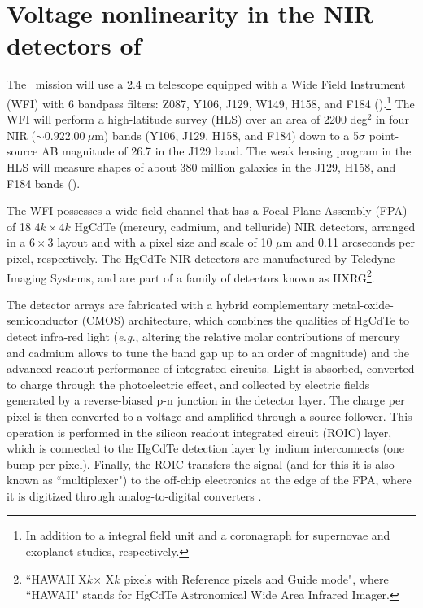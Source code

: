 \documentclass[11pt,preprint,flushrt]{aastex}
\begin{document}
\section{Voltage nonlinearity in the NIR detectors of \wfa}
\label{section:NL}

The \wfa\ mission will use a 2.4 m telescope equipped with a Wide Field Instrument (WFI) with 6 bandpass filters: Z087, Y106, J129, W149, H158, and F184 (\citealt{spergel15}).\footnote{In addition to a integral field unit and a coronagraph for supernovae and exoplanet studies, respectively.} The WFI will perform a high-latitude survey (HLS) over an area of 2200 deg$^2$ in four NIR ($\sim0.92$\textendash $2.00\ \mu$m) bands (Y106, J129, H158, and F184) down to a 5$\sigma$ point-source AB magnitude of 26.7 in the J129 band. The weak lensing program in the HLS will measure shapes of about 380 million galaxies in the J129, H158, and F184 bands (\citealt{spergel15}). 

The WFI possesses a wide-field channel that has a Focal Plane Assembly (FPA) of 18 $4 k\times 4k$ HgCdTe (mercury, cadmium, and telluride) NIR detectors, arranged in a $6\times3$ layout and with a pixel size and scale of 10 $\mu$m and 0.11 arcseconds per pixel, respectively. The HgCdTe NIR detectors are manufactured by Teledyne Imaging Systems, and are part of a family of detectors known as HXRG\footnote{``HAWAII X$k$$\times$ X$k$ pixels with Reference pixels and Guide mode", where ``HAWAII" stands for HgCdTe Astronomical Wide Area Infrared Imager.}. 

The detector arrays are fabricated with a hybrid complementary metal-oxide-semiconductor (CMOS) architecture, which combines the qualities of HgCdTe to detect infra-red light (\emph{e.g.}, altering the relative molar contributions of mercury and cadmium allows to tune the band gap up to an order of magnitude) and the advanced readout performance of integrated circuits. Light is absorbed, converted to charge through the photoelectric effect, and collected by electric fields generated by a reverse-biased p-n junction in the detector layer.  The charge per pixel is then converted to a voltage and amplified through a source follower. This operation is performed in the silicon readout integrated circuit (ROIC) layer, which is connected to the HgCdTe detection layer by indium interconnects (one bump per pixel). Finally, the ROIC transfers the signal (and for this it is also known as ``multiplexer") to the off-chip electronics at the edge of the FPA, where it is digitized through analog-to-digital converters \citep{beletic08}.
\end{document}
